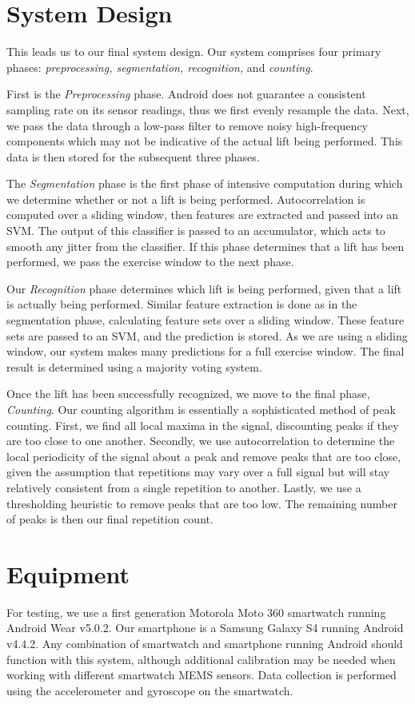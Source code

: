 \section{System Design}

This leads us to our final system design. Our system comprises four primary phases: \textit{preprocessing, segmentation, recognition,} and \textit{counting}. 

First is the \textit{Preprocessing} phase. Android does not guarantee a consistent sampling rate on its sensor readings, thus we first evenly resample the data. Next, we pass the data through a low-pass filter to remove noisy high-frequency components which may not be indicative of the actual lift being performed. This data is then stored for the subsequent three phases.

The \textit{Segmentation} phase is the first phase of intensive computation during which we determine whether or not a lift is being performed. Autocorrelation is computed over a sliding window, then features are extracted and passed into an SVM. The output of this classifier is passed to an accumulator, which acts to smooth any jitter from the classifier. If this phase determines that a lift has been performed, we pass the exercise window to the next phase.

Our \textit{Recognition} phase determines which lift is being performed, given that a lift is actually being performed. Similar feature extraction is done as in the segmentation phase, calculating feature sets over a sliding window. These feature sets are passed to an SVM, and the prediction is stored. As we are using a sliding window, our system makes many predictions for a full exercise window. The final result is determined using a majority voting system.

Once the lift has been successfully recognized, we move to the final phase, \textit{Counting}. Our counting algorithm is essentially a sophisticated method of peak counting. First, we find all local maxima in the signal, discounting peaks if they are too close to one another. Secondly, we use autocorrelation to determine the local periodicity of the signal about a peak and remove peaks that are too close, given the assumption that repetitions may vary over a full signal but will stay relatively consistent from a single repetition to another. Lastly, we use a thresholding heuristic to remove peaks that are too low. The remaining number of peaks is then our final repetition count. 

\section{Equipment}

For testing, we use a first generation Motorola Moto 360 smartwatch running Android Wear v5.0.2. Our smartphone is a Samsung Galaxy S4 running Android v4.4.2. Any combination of smartwatch and smartphone running Android should function with this system, although additional calibration may be needed when working with different smartwatch MEMS sensors. Data collection is performed using the accelerometer and gyroscope on the smartwatch.
